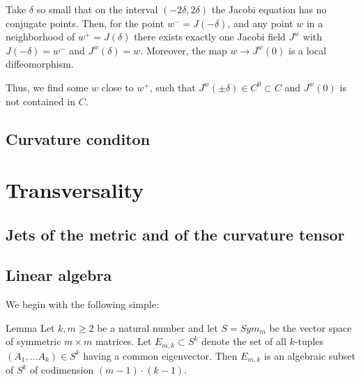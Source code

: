 \documentclass[a4paper,10pt]{article}
\begin{document}
	Take $\delta$ so small that on the interval $(-2\delta, 2\delta)$ the Jacobi equation has no conjugate points.
	Then, for the point $w^-= J(-\delta)$, and any point  $w$ in a neighborhood of $w^+ =J(\delta)$ there exists exactly one Jacobi field $J^w$
		with $J(-\delta)=w^-$ and $J^w(\delta )= w$.  Moreover, the map $w\to J^w(0)$ is a local diffeomorphism.
		
		Thus, we find some $w$ close to $w^+$, such that $J^w (\pm \delta) \in C^0 \subset C$ and $J^w(0)$ is not contained in $C$. 
\qeds


\subsection{Curvature conditon}



\section{Transversality}
\subsection{Jets of the metric and of the curvature tensor}




\subsection{Linear algebra}
We begin with the following simple:
\begin{thm}{Lemma}
	Let $k,m\geq 2$ be a natural number and let  $S=Sym _m$ be the vector space of symmetric 
	$m\times m$ matrices.  Let $E_{m,k} \subset S^k$ denote   the set of all $k$-tuples $(A_1,...A_k) \in S^k$  having a common eigenvector.   Then $E_{m,k}$ is an algebraic subset
	of $S^k$ of codimension  $(m-1)\cdot (k-1)$.
\end{thm}








\end{document}
